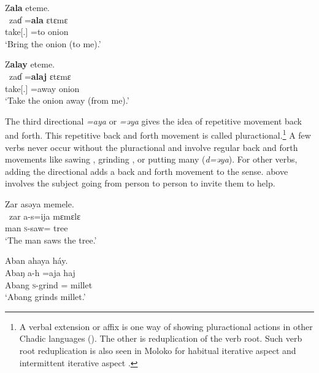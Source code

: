 \ea\label{ex:7:112}
Z\textbf{ala}  eteme.\\      
\gll  \ zaɗ    =\textbf{ala}    ɛtɛmɛ\\
      take[{\twoS}.{\IMP}]  =to    onion\\
\glt  ‘Bring the onion (to me).’\\
\z 

\ea\label{ex:7:113}
Z\textbf{alay}  eteme.\\
\gll  \ zaɗ    =\textbf{alaj}    ɛtɛmɛ\\
      take[{\twoS}.{\IMP}]  =away    onion\\
\glt  ‘Take the onion away (from me).’\\
\z 

The third directional \textit{=aya} or \textit{=}\textit{əya} gives the idea of repetitive movement back and forth. This repetitive back and forth movement is called pluractional.\footnote{A verbal extension or affix is one way of showing pluractional actions in other Chadic languages (\citealt{Newman1990}). The other is reduplication of the verb root. Such verb root reduplication is also seen in Moloko for habitual iterative aspect  and intermittent iterative aspect .} A few verbs never occur without the pluractional and involve regular back and forth movements like sawing , grinding , or putting many (\textit{d=əya}). For other verbs, adding the directional adds a back and forth movement to the sense.  above involves the subject going from person to person to invite them to help. 

\ea\label{ex:7:114}
Zar  asəya  memele.\\
\gll  \ zar  a-s=ija    mɛmɛlɛ\\
      man    \textsc{s}-saw={\PLU}  tree\\
\glt  ‘The man saws the tree.’\\
\z 

\ea\label{ex:7:115}
Aban  ahaya  háy.\\
\gll  Abaŋ   a-h  =aja  haj\\
      Abang  \textsc{s}-grind  ={\PLU}  millet\\
\glt  ‘Abang grinds millet.’\\
\z 

